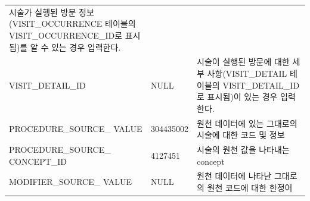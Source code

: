\documentclass[10.5pt]{book}
\theoremstyle{definition}
\theoremstyle{definition}
\theoremstyle{definition}
\theoremstyle{remark}
\begin{document}
\begin{longtable}[]{@{}lll@{}}
\begin{minipage}[t]{0.48\columnwidth}
시술가 실행된 방문 정보(VISIT\_OCCURRENCE 테이블의
VISIT\_OCCURRENCE\_ID로 표시됨)를 알 수 있는 경우 입력한다.\strut
\end{minipage}\tabularnewline
\begin{minipage}[t]{0.28\columnwidth}\raggedright\strut
VISIT\_DETAIL\_ID\strut
\end{minipage} & \begin{minipage}[t]{0.16\columnwidth}\raggedright\strut
NULL\strut
\end{minipage} & \begin{minipage}[t]{0.48\columnwidth}\raggedright\strut
시술이 실행된 방문에 대한 세부 사항(VISIT\_DETAIL 테이블의
VISIT\_DETAIL\_ID로 표시됨)이 있는 경우 입력한다.\strut
\end{minipage}\tabularnewline
\begin{minipage}[t]{0.28\columnwidth}\raggedright\strut
PROCEDURE\_SOURCE\_ VALUE\strut
\end{minipage} & \begin{minipage}[t]{0.16\columnwidth}\raggedright\strut
304435002\strut
\end{minipage} & \begin{minipage}[t]{0.48\columnwidth}\raggedright\strut
원천 데이터에 있는 그대로의 시술에 대한 코드 및 정보\strut
\end{minipage}\tabularnewline
\begin{minipage}[t]{0.28\columnwidth}\raggedright\strut
PROCEDURE\_SOURCE\_ CONCEPT\_ID\strut
\end{minipage} & \begin{minipage}[t]{0.16\columnwidth}\raggedright\strut
4127451\strut
\end{minipage} & \begin{minipage}[t]{0.48\columnwidth}\raggedright\strut
시술의 원천 값을 나타내는 concept\strut
\end{minipage}\tabularnewline
\begin{minipage}[t]{0.28\columnwidth}\raggedright\strut
MODIFIER\_SOURCE\_ VALUE\strut
\end{minipage} & \begin{minipage}[t]{0.16\columnwidth}\raggedright\strut
NULL\strut
\end{minipage} & \begin{minipage}[t]{0.48\columnwidth}\raggedright\strut
원천 데이터에 나타난 그대로의 원천 코드에 대한 한정어\strut
\end{minipage}\tabularnewline
\bottomrule
\end{longtable}
\end{document}
